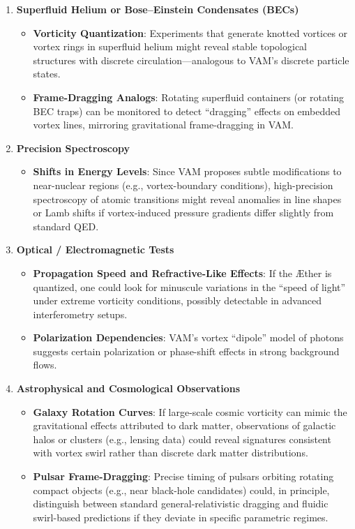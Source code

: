 \documentclass[aps,preprint,superscriptaddress]{revtex4-2}
\begin{document}
    \begin{enumerate}
        \item \textbf{Superfluid Helium or Bose–Einstein Condensates (BECs)}
        \begin{itemize}
            \item \textbf{Vorticity Quantization}: Experiments that generate knotted vortices or vortex rings in superfluid helium might reveal stable topological structures with discrete circulation—analogous to VAM’s discrete particle states.
            \item \textbf{Frame-Dragging Analogs}: Rotating superfluid containers (or rotating BEC traps) can be monitored to detect “dragging” effects on embedded vortex lines, mirroring gravitational frame-dragging in VAM.
        \end{itemize}

        \item \textbf{Precision Spectroscopy}
        \begin{itemize}
            \item \textbf{Shifts in Energy Levels}: Since VAM proposes subtle modifications to near-nuclear regions (e.g., vortex-boundary conditions), high-precision spectroscopy of atomic transitions might reveal anomalies in line shapes or Lamb shifts if vortex-induced pressure gradients differ slightly from standard QED.
        \end{itemize}

        \item \textbf{Optical / Electromagnetic Tests}
        \begin{itemize}
            \item \textbf{Propagation Speed and Refractive-Like Effects}: If the Æther is quantized, one could look for minuscule variations in the “speed of light” under extreme vorticity conditions, possibly detectable in advanced interferometry setups.
            \item \textbf{Polarization Dependencies}: VAM’s vortex “dipole” model of photons suggests certain polarization or phase-shift effects in strong background flows.
        \end{itemize}

        \item \textbf{Astrophysical and Cosmological Observations}
        \begin{itemize}
            \item \textbf{Galaxy Rotation Curves}: If large-scale cosmic vorticity can mimic the gravitational effects attributed to dark matter, observations of galactic halos or clusters (e.g., lensing data) could reveal signatures consistent with vortex swirl rather than discrete dark matter distributions.
            \item \textbf{Pulsar Frame-Dragging}: Precise timing of pulsars orbiting rotating compact objects (e.g., near black-hole candidates) could, in principle, distinguish between standard general-relativistic dragging and fluidic swirl-based predictions if they deviate in specific parametric regimes.
        \end{itemize}
    \end{enumerate}
\end{document}
